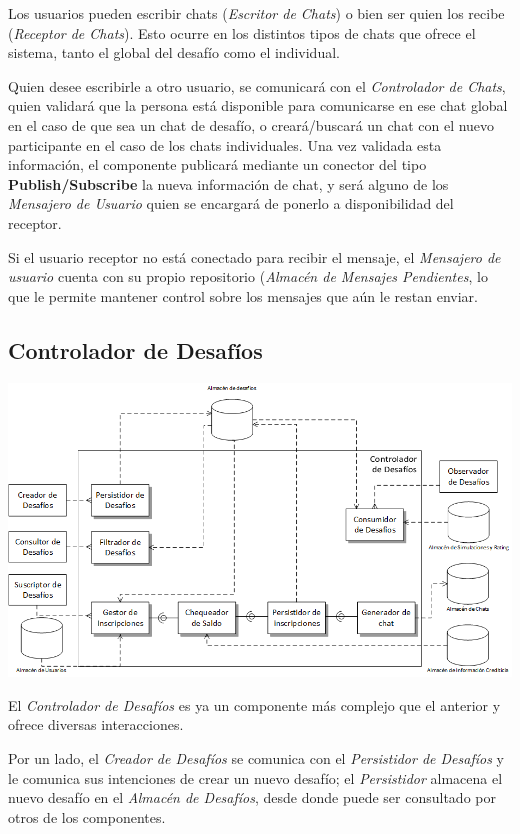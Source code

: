 Los usuarios pueden escribir chats (\emph{Escritor de Chats}) o bien ser quien los recibe (\emph{Receptor de Chats}). Esto ocurre en los distintos tipos de chats que ofrece el sistema, tanto el global del desafío como el individual. 

Quien desee escribirle a otro usuario, se comunicará con el \emph{Controlador de Chats}, quien validará que la persona está disponible para comunicarse en ese chat global en el caso de que sea un chat de desafío, o creará/buscará un chat con el nuevo participante en el caso de los chats individuales. Una vez validada esta información, el componente publicará mediante un conector del tipo \textbf{Publish/Subscribe} la nueva información de chat, y será alguno de los \emph{Mensajero de Usuario} quien se encargará de ponerlo a disponibilidad del receptor. 

Si el usuario receptor no está conectado para recibir el mensaje, el \emph{Mensajero de usuario} cuenta con su propio repositorio (\emph{Almacén de Mensajes Pendientes}, lo que le permite mantener control sobre los mensajes que aún le restan enviar.

\newpage
\subsection{Controlador de Desafíos}
\begin{center}
\includegraphics[scale=0.80,angle=90]{diagramas/controlador_de_desafios}
\label{fig:controlador_de_desafios}
\end{center}

El \emph{Controlador de Desafíos} es ya un componente más complejo que el anterior y ofrece diversas interacciones.

Por un lado, el \emph{Creador de Desafíos} se comunica con el \emph{Persistidor de Desafíos} y le comunica sus intenciones de crear un nuevo desafío; el \emph{Persistidor} almacena el nuevo desafío en el \emph{Almacén de Desafíos}, desde donde puede ser consultado por otros de los componentes.

